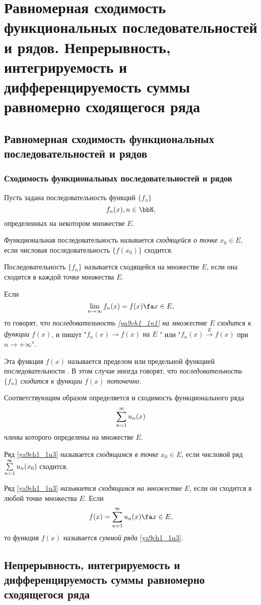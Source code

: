 \chapter{Равномерная сходимость функциональных последовательностей и рядов. Непрерывность, интегрируемость и дифференцируемость суммы равномерно сходящегося ряда}

\section{Равномерная сходимость функциональных последовательностей и рядов}

\subsection{Сходимость функциональных последовательностей и рядов}

Пусть задана последовательность функций $\{f_n\}$
\begin{equation} \label{ya9ch1_1n1}
f_n(x), n\in \bbN, 
\end{equation}
определенных на некотором множестве $E$.
\begin{defn} Функциональная последовательность называется \textit{сходящейся о точке} $x_0 \in E$, если числовая последовательность $\{f(x_0)\}$ сходится.

Последовательность $\{f_n\}$ называется сходящейся на множестве $E$, если она сходится в каждой точке множества $E$.

Если
\begin{equation} \label{ya9ch1_1n2}
\lim_{n \to \infty} f_n(x) = f(x) \fa x\in E,
\end{equation}
то говорят, что \textit{последовательность \eqref{ya9ch1_1n1} на множестве $E$ сходится к функции} $f(x)$, и пишут "$f_n(x)\to f(x) \textit{ на } E$ " или "$f_n(x) \xrightarrow{E} f(x)$ при $n \to +\infty $".

Эта функция $f(x)$ называется пределом или предельной функцией последовательности . В этом случае иногда говорят, что \textit{последовательность $\{f_n\}$ сходится к функции $f(x)$ поточечно}.
\end{defn}

Соответствующим образом определяется и сходимость функционального ряда
\begin{equation} \label{ya9ch1_1n3}
\sum_{n=1}^{\infty}\limits u_n(x)
\end{equation}
члены которого определены на множестве $E$.
\begin{defn} Ряд \eqref{ya9ch1_1n3} называется \textit{сходящимся в точке} $x_0 \in E$, если числовой ряд $\sum_{n=1}^{\infty}\limits u_n(x_0)$ сходится.

Ряд \eqref{ya9ch1_1n3} \textit{называется сходящимся на множестве} $E$, если он сходится в любой точке множества $E$. Если
\begin{equation} \label{ya9ch1_1n4}
f(x)=\sum_{n=1}^{\infty}\limits u_n(x) \fa x \in E,
\end{equation}
то функция $f(x)$ называется \textit{суммой ряда} \eqref{ya9ch1_1n3}.
\end{defn}

\section{Непрерывность, интегрируемость и дифференцируемость суммы равномерно сходящегося ряда}